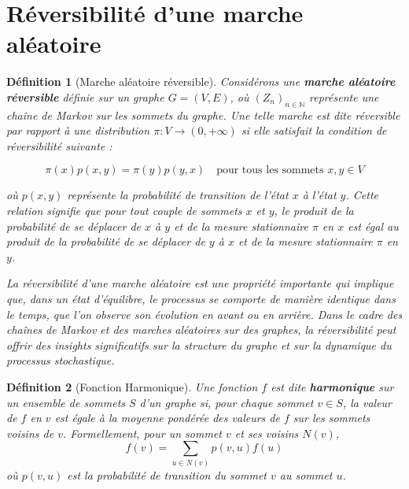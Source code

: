 \documentclass{article}
\theoremstyle{pasdepoint}
\newtheorem{definition}{Définition}
\theoremstyle{break}
\theoremstyle{pasdepoint}
\begin{document}
\section{Réversibilité d'une marche aléatoire}

\begin{definition}[Marche aléatoire réversible]
    Considérons une \textbf{marche aléatoire réversible} définie sur un graphe $G = (V, E)$, où $(Z_n)_{n \in \mathbb{N}}$ représente une chaîne de Markov sur les sommets du graphe. Une telle marche est dite réversible par rapport à une distribution $\pi : V \rightarrow (0, +\infty)$ si elle satisfait la condition de réversibilité suivante :

\[
\pi(x)p(x, y) = \pi(y)p(y, x) \quad \text{pour tous les sommets } x, y \in V
\]

où $p(x, y)$ représente la probabilité de transition de l'état $x$ à l'état $y$. Cette relation signifie que pour tout couple de sommets $x$ et $y$, le produit de la probabilité de se déplacer de $x$ à $y$ et de la mesure stationnaire $\pi$ en $x$ est égal au produit de la probabilité de se déplacer de $y$ à $x$ et de la mesure stationnaire $\pi$ en $y$.

La réversibilité d'une marche aléatoire est une propriété importante qui implique que, dans un état d'équilibre, le processus se comporte de manière identique dans le temps, que l'on observe son évolution en avant ou en arrière. Dans le cadre des chaînes de Markov et des marches aléatoires sur des graphes, la réversibilité peut offrir des insights significatifs sur la structure du graphe et sur la dynamique du processus stochastique.

\end{definition}

\begin{definition}[Fonction Harmonique]
    Une fonction \(f\) est dite \textbf{harmonique} sur un ensemble de sommets \(S\) d'un graphe si, pour chaque sommet \(v \in S\), la valeur de \(f\) en \(v\) est égale à la moyenne pondérée des valeurs de \(f\) sur les sommets voisins de \(v\). Formellement, pour un sommet \(v\) et ses voisins \(N(v)\),
    \[
    f(v) = \sum_{u \in N(v)} p(v, u) f(u)
    \]
    où \(p(v, u)\) est la probabilité de transition du sommet \(v\) au sommet \(u\).
\end{definition}
\end{document}
